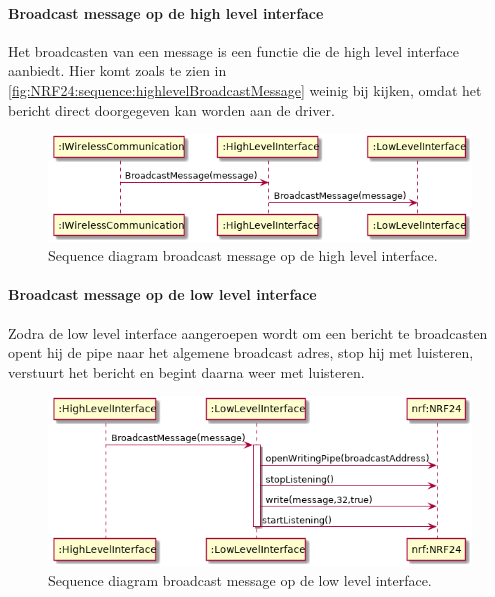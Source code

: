 \documentclass[a4paper, 11pt, oneside]{report}
\begin{document}
\paragraph{Broadcast message op de high level interface}
\label{DetailedDesign:NRF24:sequence:highlevelBroadcastMessage}
Het broadcasten van een message is een functie die de high level interface aanbiedt.
Hier komt zoals te zien in \autoref{fig:NRF24:sequence:highlevelBroadcastMessage} weinig bij kijken, omdat het bericht direct doorgegeven kan worden aan de driver.
\begin{figure}[H]
	\begin{center}\includegraphics[width=.7\linewidth]{UML/out/NRF24/sequence/highlevelBroadcastMessage/highlevelBroadcastMessage.png}\end{center}
	\caption{Sequence diagram broadcast message op de high level interface.}
	\label{fig:NRF24:sequence:highlevelBroadcastMessage}
\end{figure}

\paragraph{Broadcast message op de low level interface}
\label{DetailedDesign:NRF24:sequence:lowlevelBroadcastMessage}
Zodra de low level interface aangeroepen wordt om een bericht te broadcasten opent hij de pipe naar het algemene broadcast adres, stop hij met luisteren, verstuurt het bericht en begint daarna weer met luisteren.
\begin{figure}[H]
	\begin{center}\includegraphics[width=.8\linewidth]{UML/out/NRF24/sequence/lowlevelBroadcastMessage/lowlevelBroadcastMessage.png}\end{center}
	\caption{Sequence diagram broadcast message op de low level interface.}
	\label{fig:NRF24:sequence:lowlevelBroadcastMessage}
\end{figure}
\end{document}
